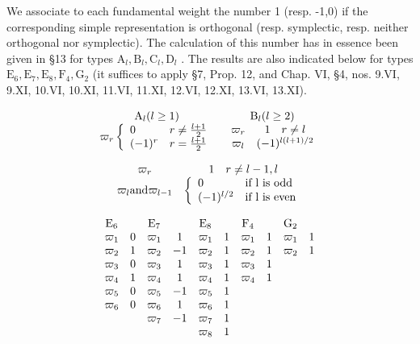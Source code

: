 
We associate to each fundamental weight the number 1 (resp. -1,0) if the corresponding simple representation is orthogonal (resp. symplectic, resp. neither orthogonal nor symplectic). The calculation of this number has in essence been given in §13 for types \(\mathrm{A}_l, \mathrm{B}_l, \mathrm{C}_l, \mathrm{D}_l\) . The results are also indicated below for types \(\mathrm{E}_6, \mathrm{E}_7, \mathrm{E}_8, \mathrm{F}_4, \mathrm{G}_2\) (it suffices to apply §7, Prop. 12, and Chap. VI, §4, nos. 9.VI, 9.XI, 10.VI, 10.XI, 11.VI, 11.XI, 12.VI, 12.XI, 13.VI, 13.XI).

\[
\begin{array}{c c} \mathrm{A} _ {l} (l \geq 1) & \mathrm{B} _ {l} (l \geq 2) \\ \varpi_ {r} \left\{ \begin{array}{l l} 0 & r \neq \frac {l + 1}{2} \\ (- 1) ^ {r} & r = \frac {l + 1}{2} \end{array} \right. & \begin{array}{c c} \varpi_ {r} & 1 \quad r \neq l \\ \varpi_ {l} & (- 1) ^ {l (l + 1) / 2} \end{array} \end{array}
\]

\[
\begin{array}{c c} \varpi_ {r} & 1 \quad r \neq l - 1, l \\ \varpi_ {l} \text {and} \varpi_ {l - 1} & \left\{ \begin{array}{l l} 0 & \text {if l is odd} \\ (- 1) ^ {l / 2} & \text {if l is even} \end{array} \right. \end{array}
\]

\[
\begin{array}{c c c c c c c c c c} \mathrm{E} _ {6} & & \mathrm{E} _ {7} & & \mathrm{E} _ {8} & & \mathrm{F} _ {4} & & \mathrm{G} _ {2} \\ \varpi_ {1} & 0 & \varpi_ {1} & 1 & \varpi_ {1} & 1 & \varpi_ {1} & 1 & \varpi_ {1} & 1 \\ \varpi_ {2} & 1 & \varpi_ {2} & - 1 & \varpi_ {2} & 1 & \varpi_ {2} & 1 & \varpi_ {2} & 1 \\ \varpi_ {3} & 0 & \varpi_ {3} & 1 & \varpi_ {3} & 1 & \varpi_ {3} & 1 \\ \varpi_ {4} & 1 & \varpi_ {4} & 1 & \varpi_ {4} & 1 & \varpi_ {4} & 1 \\ \varpi_ {5} & 0 & \varpi_ {5} & - 1 & \varpi_ {5} & 1 \\ \varpi_ {6} & 0 & \varpi_ {6} & 1 & \varpi_ {6} & 1 \\ & & \varpi_ {7} & - 1 & \varpi_ {7} & 1 \\ & & & & \varpi_ {8} & 1 \end{array}
\]
\relax{}
